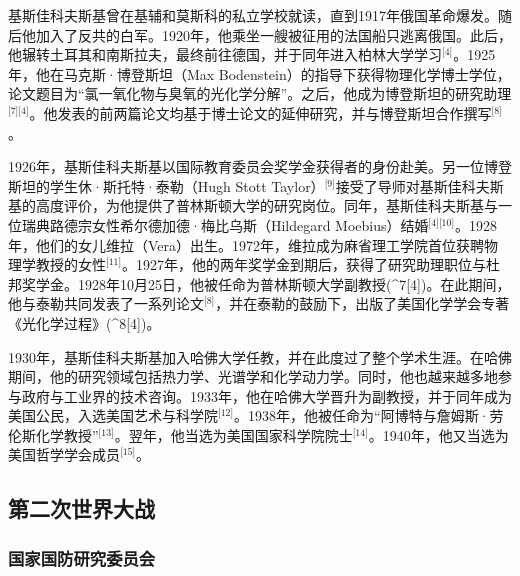 基斯佳科夫斯基曾在基辅和莫斯科的私立学校就读，直到1917年俄国革命爆发。随后他加入了反共的白军。1920年，他乘坐一艘被征用的法国船只逃离俄国。此后，他辗转土耳其和南斯拉夫，最终前往德国，并于同年进入柏林大学学习\(^\text{[4]}\)。1925年，他在马克斯·博登斯坦（Max Bodenstein）的指导下获得物理化学博士学位，论文题目为“氯一氧化物与臭氧的光化学分解”。之后，他成为博登斯坦的研究助理\(^\text{[7][4]}\)。他发表的前两篇论文均基于博士论文的延伸研究，并与博登斯坦合作撰写\(^\text{[8]}\)。

1926年，基斯佳科夫斯基以国际教育委员会奖学金获得者的身份赴美。另一位博登斯坦的学生休·斯托特·泰勒（Hugh Stott Taylor）\(^\text{[9]}\)接受了导师对基斯佳科夫斯基的高度评价，为他提供了普林斯顿大学的研究岗位。同年，基斯佳科夫斯基与一位瑞典路德宗女性希尔德加德·梅比乌斯（Hildegard Moebius）结婚\(^\text{[4][10]}\)。1928年，他们的女儿维拉（Vera）出生。1972年，维拉成为麻省理工学院首位获聘物理学教授的女性\(^\text{[11]}\)。1927年，他的两年奖学金到期后，获得了研究助理职位与杜邦奖学金。1928年10月25日，他被任命为普林斯顿大学副教授(^7[4])。在此期间，他与泰勒共同发表了一系列论文\(^\text{[8]}\)，并在泰勒的鼓励下，出版了美国化学学会专著《光化学过程》(^8[4])。

1930年，基斯佳科夫斯基加入哈佛大学任教，并在此度过了整个学术生涯。在哈佛期间，他的研究领域包括热力学、光谱学和化学动力学。同时，他也越来越多地参与政府与工业界的技术咨询。1933年，他在哈佛大学晋升为副教授，并于同年成为美国公民，入选美国艺术与科学院\(^\text{[12]}\)。1938年，他被任命为“阿博特与詹姆斯·劳伦斯化学教授”\(^\text{[13]}\)。翌年，他当选为美国国家科学院院士\(^\text{[14]}\)。1940年，他又当选为美国哲学学会成员\(^\text{[15]}\)。
\subsection{第二次世界大战}
\subsubsection{国家国防研究委员会}
